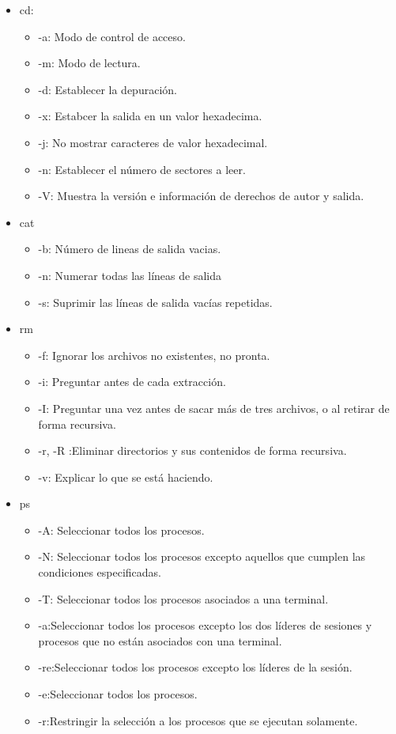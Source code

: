 \documentclass[12pt]{article}
\begin{document}
\begin{itemize}
    
    
    \item cd: 
        \begin{itemize}
        \item -a: Modo de control de acceso.
        \item -m: Modo de lectura.
        \item -d: Establecer la depuración. 
        \item -x: Estabcer la salida en un valor hexadecima.
        \item -j: No mostrar caracteres de valor hexadecimal.
        \item -n: Establecer el número de sectores a leer.
        \item -V: Muestra la versión e información de derechos de autor y salida.
    \end{itemize}
    
    \item cat
    \begin{itemize}
        \item -b: Número de lineas de salida vacias.
        \item -n: Numerar todas las líneas de salida
        \item -s: Suprimir las líneas de salida vacías repetidas.
    \end{itemize}
    
    \item rm 
    \begin{itemize}
        \item -f: Ignorar los archivos no existentes, no pronta.
        \item -i: Preguntar antes de cada extracción.
        \item -I: Preguntar una vez antes de sacar más de tres archivos, o al retirar de forma recursiva.
        \item -r, -R :Eliminar directorios y sus contenidos de forma recursiva.
        \item -v: Explicar lo que se está haciendo.
    \end{itemize}
    \item ps 
    \begin{itemize}
        \item -A: Seleccionar todos los procesos.
        \item -N: Seleccionar todos los procesos excepto aquellos que cumplen las condiciones especificadas.
        \item -T: Seleccionar todos los procesos asociados a una terminal.
        \item -a:Seleccionar todos los procesos excepto los dos líderes de sesiones  y procesos que no están asociados con una terminal.
        \item -re:Seleccionar todos los procesos excepto los líderes de la sesión.
        \item -e:Seleccionar todos los procesos.
        \item -r:Restringir la selección a los procesos que se ejecutan solamente.
    \end{itemize}


\end{itemize}
\end{document}

